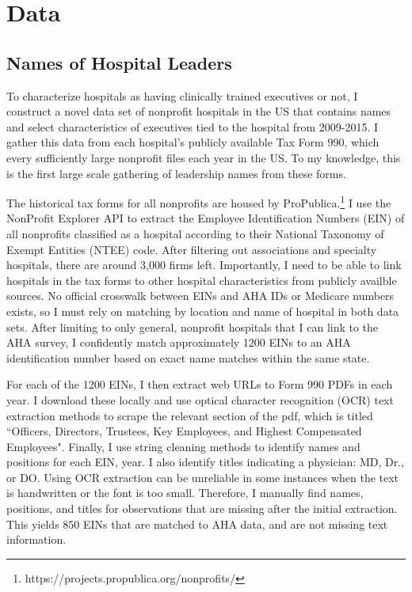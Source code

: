 \documentclass[12pt]{article}
\begin{document}
  
	
	\section{Data}\label{sec:data}

    \subsection{Names of Hospital Leaders}

    To characterize hospitals as having clinically trained executives or not, I construct a novel data set of nonprofit hospitals in the US that contains names and select characteristics of executives tied to the hospital from 2009-2015. I gather this data from each hospital's publicly available Tax Form 990, which every sufficiently large nonprofit files each year in the US. To my knowledge, this is the first large scale gathering of leadership names from these forms. 

    The historical tax forms for all nonprofits are housed by ProPublica.\footnote{https://projects.propublica.org/nonprofits/} I use the NonProfit Explorer API to extract the Employee Identification Numbers (EIN) of all nonprofits classified as a hospital according to their National Taxonomy of Exempt Entities (NTEE) code. After filtering out associations and specialty hospitals, there are around 3,000 firms left. Importantly, I need to be able to link hospitals in the tax forms to other hospital characteristics from publicly availble sources. No official crosswalk between EINs and AHA IDs or Medicare numbers exists, so I must rely on matching by location and name of hospital in both data sets. After limiting to only general, nonprofit hospitals that I can link to the AHA survey, I confidently match approximately 1200 EINs to an AHA identification number based on exact name matches within the same state. 
    
    For each of the 1200 EINs, I then extract web URLs to Form 990 PDFs in each year. I download these locally and use optical character recognition (OCR) text extraction methods to scrape the relevant section of the pdf, which is titled ``Officers, Directors, Trustees, Key Employees, and Highest Compensated Employees". Finally, I use string cleaning methods to identify names and positions for each EIN, year. I also identify titles indicating a physician: MD, Dr., or DO. Using OCR extraction can be unreliable in some instances when the text is handwritten or the font is too small. Therefore, I manually find names, positions, and titles for observations that are missing after the initial extraction. This yields 850 EINs that are matched to AHA data, and are not missing text information. 
\end{document}
